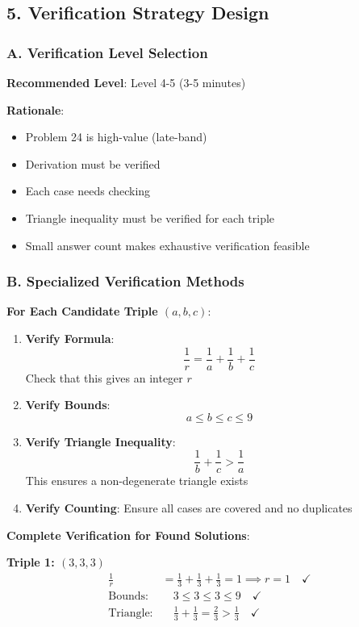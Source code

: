 \documentclass[12pt]{article}
\begin{document}
\begin{verificationbox}
\subsection*{5. Verification Strategy Design}

\subsubsection*{A. Verification Level Selection}

\textbf{Recommended Level}: Level 4-5 (3-5 minutes)

\textbf{Rationale}:
\begin{itemize}
    \item Problem 24 is high-value (late-band)
    \item Derivation must be verified
    \item Each case needs checking
    \item Triangle inequality must be verified for each triple
    \item Small answer count makes exhaustive verification feasible
\end{itemize}

\subsubsection*{B. Specialized Verification Methods}

\textbf{For Each Candidate Triple $(a, b, c)$}:

\begin{enumerate}
    \item \textbf{Verify Formula}:
    $$\frac{1}{r} = \frac{1}{a} + \frac{1}{b} + \frac{1}{c}$$
    Check that this gives an integer $r$
    
    \item \textbf{Verify Bounds}:
    $$a \leq b \leq c \leq 9$$
    
    \item \textbf{Verify Triangle Inequality}:
    $$\frac{1}{b} + \frac{1}{c} > \frac{1}{a}$$
    This ensures a non-degenerate triangle exists
    
    \item \textbf{Verify Counting}:
    Ensure all cases are covered and no duplicates
\end{enumerate}

\textbf{Complete Verification for Found Solutions}:

\textbf{Triple 1: $(3, 3, 3)$}
\begin{align*}
\frac{1}{r} &= \frac{1}{3} + \frac{1}{3} + \frac{1}{3} = 1 \implies r = 1 \quad \checkmark \\
\text{Bounds:} &\quad 3 \leq 3 \leq 3 \leq 9 \quad \checkmark \\
\text{Triangle:} &\quad \frac{1}{3} + \frac{1}{3} = \frac{2}{3} > \frac{1}{3} \quad \checkmark
\end{align*}


\end{verificationbox}
\end{document}
